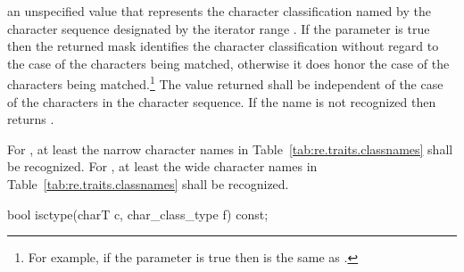 \begin{itemdescr}
\pnum\returns  an unspecified value that represents
the character classification named by the character sequence
designated by the iterator range .
If the parameter  is true then the returned mask identifies the
character classification without regard to the case of the characters being
matched, otherwise it does honor the case of the characters being
matched.\footnote{For example, if the parameter  is true then
\tcode{[[:lower:]]} is the same as \tcode{[[:alpha:]]}.}
The value
returned shall be independent of the case of the characters in
the character sequence. If the name
is not recognized then returns .

\pnum
\remarks  For , at least the narrow character names
in Table~\ref{tab:re.traits.classnames} shall be recognized.
For , at least the wide character names
in Table~\ref{tab:re.traits.classnames} shall be recognized.
\end{itemdescr}

%
%
\begin{itemdecl}
bool isctype(charT c, char_class_type f) const; 
\end{itemdecl}

